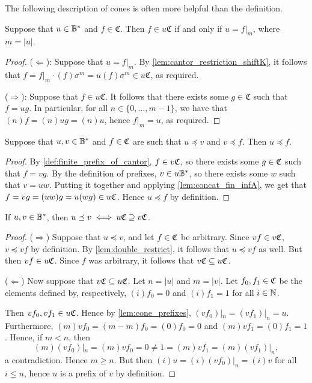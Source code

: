 The following description of cones is often more helpful than the definition.
\begin{lemma}\label{lem:cone_prefixes}
    Suppose that \(u\in \mathbb{B}^*\) and \(f\in \mathfrak{C}\). Then \(f\in u\mathfrak{C}\) if and only if \(u=f|_m\),
    where $m = |u|$.
\end{lemma}
\begin{proof}
    ($\Leftarrow$): Suppose that $u = f|_m$. By \cref{lem:cantor_restriction_shiftK}, it follows that $f = f|_m \cdot (f)\sigma^m = u (f)\sigma^m \in u \mathfrak{C}$,
    as required.

    ($\Rightarrow$): Suppose that \(f\in u\mathfrak{C}\). It follows that there exists some \(g\in \mathfrak{C}\) such that \(f=ug\).
    In particular, for all \(n \in \{0,\ldots, m-1\}\), we have that \((n)f = (n)ug = (n)u\), hence $f|_m = u$, as required.
\end{proof}


\begin{lemma}\label{lem:double_restrict}
    Suppose that \(u, v\in \mathbb{B}^*\) and \(f\in \mathfrak{C}\) are such that \(u\preceq v\) and \(v\preceq f\). Then \(u\preceq f\).
\end{lemma}
\begin{proof}
    By \cref{def:finite_prefix_of_cantor}, $f \in v \mathfrak{C}$, so there exists some $g\in \mathfrak{C}$ such that $f = vg$.
    By the definition of prefixes, $v\in u\mathbb{B}^\ast$, so there exists some $w$ such that $v = uw$.
    Putting it together and applying \cref{lem:concat_fin_infA}, we get that $f = vg = (uw)g = u(wg) \in u\mathfrak{C}$.
    Hence $u \preceq f$ by definition.
\end{proof}

\begin{lemma}\label{lem:comp_cone_vs_word}
    If \(u, v\in \mathbb{B}^*\), then \(u\preceq v \iff u\mathfrak{C} \supseteq v\mathfrak{C}\).
\end{lemma}
\begin{proof}
($\Rightarrow$) Suppose that $u \preceq v$, and let $f\in \mathfrak{C}$ be arbitrary. Since $vf \in v\mathfrak{C}$,
$v\preceq vf$ by definition. By \cref{lem:double_restrict}, it follows that $u \preceq vf$ as well.
But then $vf \in u\mathfrak{C}$. Since $f$ was arbitrary, it follows that $v\mathfrak{C} \subseteq u\mathfrak{C}$.

($\Leftarrow$) Now suppose that $v\mathfrak{C} \subseteq u\mathfrak{C}$. Let $n = |u|$ and $m = |v|$.
Let $f_0, f_1\in \mathfrak{C}$ be the elements defined by,
respectively, $(i)f_0 = 0$ and $(i)f_1 = 1$ for all $i \in {\mathbb{N}}$.

Then $vf_0, vf_1 \in u\mathfrak{C}$. Hence by \cref{lem:cone_prefixes},
$(vf_0)|_n = (vf_1)|_n = u$. Furthermore, $(m)vf_0 = (m-m)f_0 = (0)f_0 = 0$ and
$(m)vf_1 = (0)f_1 = 1$.
Hence, if $m < n$, then
\[ (m)(vf_0)|_n = (m)vf_0 = 0 \neq 1 = (m)vf_1 = (m)(vf_1)|_n, \]
a contradiction. Hence $m \geq n$. But then
$(i)u = (i)(vf_0)|_n = (i)v$ for all $i \leq n$, hence $u$ is a prefix of $v$ by definition.
\end{proof}

